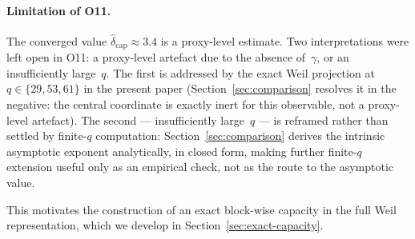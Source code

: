   \paragraph{Limitation of O11.}
    The converged value $\hat{\delta}_{\mathrm{cap}}\approx 3.4$ is a proxy-level estimate.
    Two interpretations were left open in O11: a proxy-level artefact due to the
    absence of~$\gamma$, or an insufficiently large~$q$.
    The first is addressed by the exact Weil projection at $q\in\{29,53,61\}$ in the present
    paper (Section~\ref{sec:comparison} resolves it in the negative: the central coordinate
    is exactly inert for this observable, not a proxy-level artefact).
    The second — insufficiently large~$q$ — is reframed rather than settled by finite-$q$
    computation: Section~\ref{sec:comparison} derives the intrinsic asymptotic exponent
    analytically, in closed form, making further finite-$q$ extension useful only as an
    empirical check, not as the route to the asymptotic value.

    This motivates the construction of an exact block-wise capacity in the full Weil
    representation, which we develop in Section~\ref{sec:exact-capacity}.
